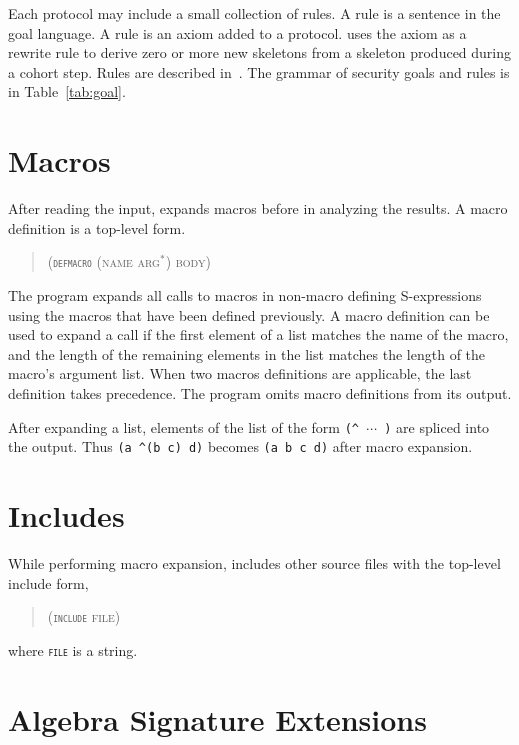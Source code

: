 \documentclass[12pt]{article}
\begin{document}
Each protocol may include a small collection of rules.  A
rule is a sentence in the goal language.  A rule is an axiom added to
a protocol.  {\cpsa} uses the axiom as a rewrite rule to derive zero
or more new skeletons from a skeleton produced during a cohort step.
Rules are described in~\cite{cpsagoals09}.  The grammar of security
goals and rules is in Table~\ref{tab:goal}.

\section{Macros}\label{sec:macros}

After reading the input, {\cpsa} expands macros before in analyzing
the results. A macro definition is a top-level form.

\begin{quote}\scshape
(\texttt{\textup{defmacro}} (name arg${}^\ast$) body)
\end{quote}

The {\cpsa} program expands all calls to macros in non-macro defining
S-expressions using the macros that have been defined previously. A
macro definition can be used to expand a call if the first element of
a list matches the name of the macro, and the length of the remaining
elements in the list matches the length of the macro's argument
list. When two macros definitions are applicable, the last definition
takes precedence. The {\cpsa} program omits macro definitions from its
output.

After expanding a list, elements of the list of the form
\verb|(^ |$\cdots$\verb| )| are spliced into the output.  Thus
\verb|(a ^(b c) d)| becomes \verb|(a b c d)| after macro expansion.

\section{Includes}\label{sec:include}

While performing macro expansion, {\cpsa} includes other source files
with the top-level include form,
\begin{quote}\scshape
(\texttt{\textup{include}} file)
\end{quote}
where \texttt{\scshape file} is a string.

\section{Algebra Signature Extensions}\label{sec:signature}
\end{document}
